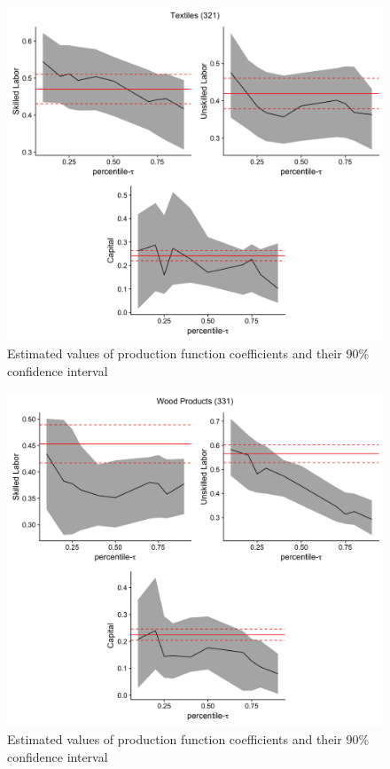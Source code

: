 \documentclass[11pt]{article}
\begin{document}
\begin{figure}[H]
\centering
\caption{Estimated values of production function coefficients and their 90\% confidence interval}
\includegraphics[width=12cm]{Coefficient_Plot_3.png}
\end{figure}

\begin{figure}[H]
\centering
\caption{Estimated values of production function coefficients and their 90\% confidence interval}
\includegraphics[width=12cm]{Coefficient_Plot_4.png}
\end{figure}
\end{document}
